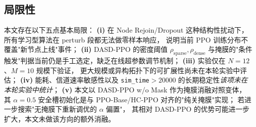 \subsection{局限性}
\label{subsec:limitations}

本文存在以下五点基本局限：
\textbf{(i)} 在 Node Rejoin/Dropout 这种结构性扰动下，
所有学习型算法在 perturb 段都无法做零样本响应，
说明当前 PPO 训练分布不覆盖"新节点上线"事件；
\textbf{(ii)} DASD-PPO 的密度阈值 \(\rho_{\mathrm{sparse}},\rho_{\mathrm{dense}}\)
与掩膜的"条件触发"判据当前仍是手工选定，缺乏在线超参数调节机制；
\textbf{(iii)} 实验仅在 \(N=12\)、\(M=10\) 规模下验证，
更大规模或异构拓扑下的可扩展性尚未在本轮实验中评估；
\textbf{(iv)} 能耗、信道速率敏感性以及 \texttt{sim\_time}\(>20000\)
的长期稳定性\emph{该项未在本轮实验中统计}；
\textbf{(v)} 本文以 DASD-PPO w/o Mask 作为掩膜消融对照变体，
其 \(\alpha=0.5\) 安全槽初始化是与 PPO-Base/HC-PPO 对齐的"纯关掩膜"实现；
若进一步搜索"无掩膜下重新调优的 \(\alpha\) 偏置"，
其相对 DASD-PPO 的优势可能进一步扩大，本文未做该方向的额外消融。
